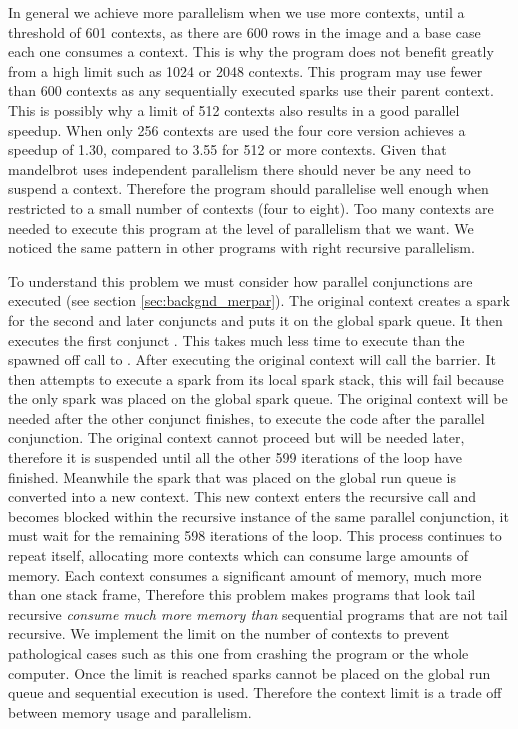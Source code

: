 In general we achieve more parallelism when we use more contexts,
until a threshold of 601 contexts,
as there are 600 rows in the image and a base case each one consumes a
context.
This is why the program does not benefit greatly from a high limit such as
1024 or 2048 contexts.
This program may use fewer than 600 contexts as any sequentially executed
sparks use their parent context.
This is possibly why a limit of 512 contexts also results in a good parallel
speedup.
When only 256 contexts are used the four core version achieves a speedup
of 1.30,
compared to 3.55 for 512 or more contexts.
Given that mandelbrot uses independent parallelism there should never be any
need to suspend a context.
Therefore the program should parallelise well enough when restricted to
a small number of contexts (four to eight).
Too many contexts are needed to execute this program at the level of
parallelism that we want.
We noticed the same pattern in other programs with right recursive
parallelism.

\label{context_limit}
To understand this problem we must consider how parallel conjunctions are
executed (see section \ref{sec:backgnd_merpar}).
The original context creates a spark for the second and later conjuncts and
puts it on the global spark queue.
It then executes the first conjunct .
This takes much less time to execute than the spawned off call to
.
After executing  the original context will call the
\joinandcontinue barrier.
It then attempts to execute a spark from its local spark stack,
this will fail because the only spark was placed on the global spark queue.
The original context will be needed after the other conjunct finishes, 
to execute the code after the parallel conjunction.
The original context cannot proceed but will be needed later,
therefore it is suspended until all the other 599 iterations of the loop
have finished.
Meanwhile the spark that was placed on the global run queue is converted
into a new context.
This new context enters the recursive call and
becomes blocked within the recursive instance of the same parallel
conjunction, it must wait for the remaining 598 iterations of the loop.
This process continues to repeat itself,
allocating more contexts which can consume large amounts of memory.
Each context consumes a significant amount of memory,
much more than one stack frame,
Therefore
this problem makes programs that look tail recursive
\emph{consume much more memory than}
sequential programs that are not tail recursive.
We implement the limit on the number of contexts to prevent pathological
cases such as this one from crashing the program or the whole computer.
Once the limit is reached sparks cannot be placed on the global run queue
and sequential execution is used.
Therefore the context limit is a trade off between memory usage and
parallelism.

